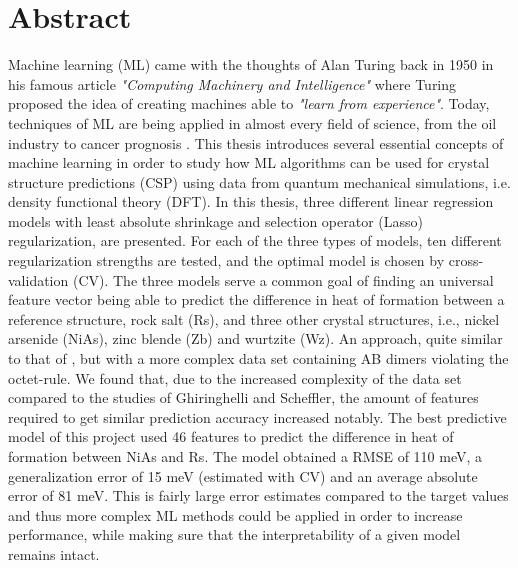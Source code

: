 

 
\frontmatter
\pagestyle{frontmatter}

\chapter*{Abstract}
Machine learning (ML) came with the thoughts of Alan Turing back in 1950 in his famous article \textit{"Computing Machinery and Intelligence"}\citep{Turing1950-TURCMA} where Turing proposed the idea of creating machines able to \emph{"learn from experience"}. Today, techniques of ML are being applied in almost every field of science, from the oil industry \citep{Sui2011748} to cancer prognosis \citep{Kourou20158}. This thesis introduces several essential concepts of machine learning in order to  study how ML algorithms can be used for crystal structure predictions (CSP) using data from quantum mechanical simulations, i.e. density functional theory (DFT). 
In this thesis, three different linear regression models with least absolute shrinkage and selection operator (Lasso) regularization, are presented. For each of the three types of models, ten different regularization strengths are tested, and the optimal model is chosen by cross-validation (CV). The three models serve a common goal of finding an universal feature vector being able to predict the difference in heat of formation between a reference structure, rock salt (Rs), and three other crystal structures, i.e., nickel arsenide (NiAs), zinc blende (Zb) and wurtzite (Wz). An approach, quite similar to that of \citep{criticalrole_descriptor}, but with a more complex data set containing AB dimers violating the octet-rule. We found that, due to the increased complexity of the data set compared to the studies of Ghiringhelli and Scheffler, the amount of features required to get similar prediction accuracy increased notably. The best predictive model of this project used 46 features to predict the difference in heat of formation between NiAs and Rs. The model obtained a RMSE of 110 meV, a generalization error of 15 meV (estimated with CV) and an average absolute error of 81 meV. This is fairly large error estimates compared to the target values and thus more complex ML methods could be applied in order to increase performance, while making sure that the interpretability of a given model remains intact.
\\[20mm]

